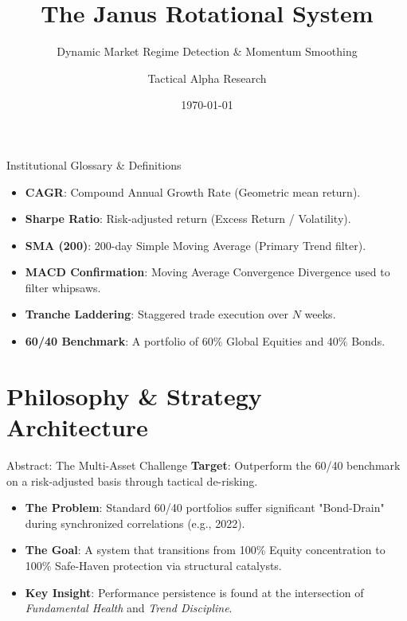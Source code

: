 \documentclass[10pt]{beamer}
\title{The Janus Rotational System}
\subtitle{Dynamic Market Regime Detection \& Momentum Smoothing}
\date{\today}
\author{Tactical Alpha Research}
\institute{Academic Portfolio Management Suite}
\begin{document}
\maketitle

\begin{frame}{Institutional Glossary \& Definitions}
    \begin{itemize}
        \item \textbf{CAGR}: Compound Annual Growth Rate (Geometric mean return).
        \item \textbf{Sharpe Ratio}: Risk-adjusted return (Excess Return / Volatility).
        \item \textbf{SMA (200)}: 200-day Simple Moving Average (Primary Trend filter).
        \item \textbf{MACD Confirmation}: Moving Average Convergence Divergence used to filter whipsaws.
        \item \textbf{Tranche Laddering}: Staggered trade execution over $N$ weeks.
        \item \textbf{60/40 Benchmark}: A portfolio of 60\% Global Equities and 40\% Bonds.
    \end{itemize}
\end{frame}

\section{Philosophy \& Strategy Architecture}

\begin{frame}{Abstract: The Multi-Asset Challenge}
    \textbf{Target}: Outperform the 60/40 benchmark on a risk-adjusted basis through tactical de-risking.
    \vspace{0.3cm}
    \begin{itemize}
        \item \textbf{The Problem}: Standard 60/40 portfolios suffer significant "Bond-Drain" during synchronized correlations (e.g., 2022).
        \item \textbf{The Goal}: A system that transitions from 100\% Equity concentration to 100\% Safe-Haven protection via structural catalysts.
        \item \textbf{Key Insight}: Performance persistence is found at the intersection of \textit{Fundamental Health} and \textit{Trend Discipline}.
    \end{itemize}
\end{frame}
\end{document}
